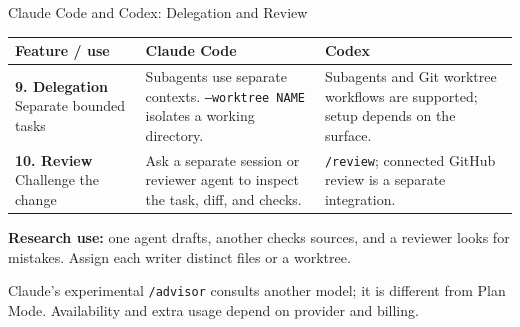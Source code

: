\begin{frame}{Claude Code and Codex: Delegation and Review}
\small
\renewcommand{\arraystretch}{1.3}
\begin{tabular}{>{\raggedright\arraybackslash}p{2.35cm}>{\raggedright\arraybackslash}p{5.1cm}>{\raggedright\arraybackslash}p{5.1cm}}
\toprule
\textbf{Feature / use} & \textbf{Claude Code} & \textbf{Codex} \\
\midrule
\textbf{9. Delegation} \newline Separate bounded tasks & Subagents use separate contexts. \texttt{--worktree NAME} isolates a working directory. & Subagents and Git worktree workflows are supported; setup depends on the surface. \\
\textbf{10. Review} \newline Challenge the change & Ask a separate session or reviewer agent to inspect the task, diff, and checks. & \texttt{/review}; connected GitHub review is a separate integration. \\
\bottomrule
\end{tabular}
\par\vspace{0.3cm}
\normalsize
\textbf{Research use:} one agent drafts, another checks sources, and a reviewer looks for mistakes. Assign each writer distinct files or a worktree.
\par\vspace{0.2cm}
\small Claude's experimental \texttt{/advisor} consults another model; it is different from Plan Mode. Availability and extra usage depend on provider and billing.
\par\vfill
{}
\end{frame}
